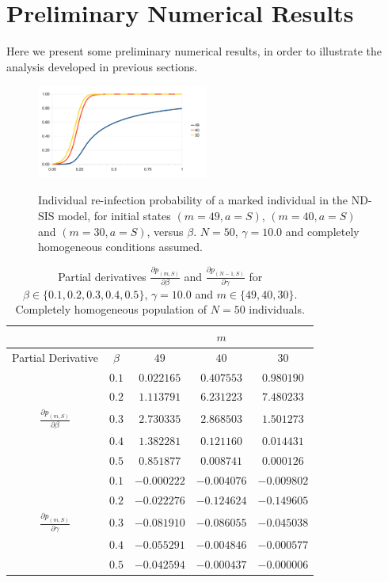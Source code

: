 \documentclass[10pt,A4paper]{article}
\begin{document}
\section{Preliminary Numerical Results}

\par Here we present some preliminary numerical results, in order to illustrate the analysis developed in previous sections.

\begin{figure}
 \centering
\includegraphics[width=0.5\textwidth]{Figure5.jpg}
\label{fig:5}
\caption{Individual re-infection probability of a marked individual in the ND-SIS model, for initial states $(m=49,a=S)$, $(m=40,a=S)$ and $(m=30,a=S)$,
versus $\beta$. $N=50$, $\gamma=10.0$ and completely homogeneous conditions assumed.}
\end{figure}

\begin{table}[h]
\centering
\begin{tabular}{|c|c|c|c|c|}
\hline
 &  &  & $m$ & \\
\hline
Partial Derivative & $\beta$ & $49$ & $40$ & $30$ \\
\hline
 & $0.1$ & $0.022165$ & $0.407553$ & $0.980190$ \\
\cline{2-5}
 & $0.2$ & $1.113791$ & $6.231223$ & $7.480233$ \\
\cline{2-5}
$\frac{\partial  p_{(m,S)}}{\partial \beta}$ & $0.3$ & $2.730335$ & $2.868503$ & $1.501273$ \\
\cline{2-5}
& $0.4$ & $1.382281$ & $0.121160$ & $0.014431$ \\
\cline{2-5}
& $0.5$ & $0.851877$ & $0.008741$ & $0.000126$ \\
\hline
 & $0.1$ & $-0.000222$ & $-0.004076$ & $-0.009802$ \\
\cline{2-5}
 & $0.2$ & $-0.022276$ & $-0.124624$ & $-0.149605$ \\
\cline{2-5}
$\frac{\partial  p_{(m,S)}}{\partial \gamma}$ & $0.3$ & $-0.081910$ & $-0.086055$ & $-0.045038$ \\
\cline{2-5}
& $0.4$ & $-0.055291$ & $-0.004846$ & $-0.000577$ \\
\cline{2-5}
& $0.5$ & $-0.042594$ & $-0.000437$ & $-0.000006$ \\
\hline
\end{tabular}
\caption{Partial derivatives $\frac{\partial p_{(m,S)}}{\partial \beta}$ and $\frac{\partial p_{(N-1,S)}}{\partial \gamma}$ for $\beta\in\{0.1,0.2,0.3,0.4,0.5\}$, $\gamma=10.0$
and $m\in\{49,40,30\}$. Completely homogeneous population of $N=50$ individuals.}
\label{tab:3}
\end{table}
\end{document}
